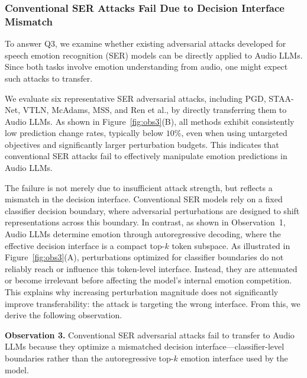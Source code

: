 
\subsubsection{Conventional SER Attacks Fail Due to Decision Interface Mismatch}
\label{sec:obs_q3}

To answer Q3, we examine whether existing adversarial attacks developed for speech emotion recognition (SER) models can be directly applied to Audio LLMs.
Since both tasks involve emotion understanding from audio, one might expect such attacks to transfer.

We evaluate six representative SER adversarial attacks, including PGD, STAA-Net, VTLN, McAdams, MSS, and Ren et al., by directly transferring them to Audio LLMs.
As shown in Figure~\ref{fig:obs3}(B), all methods exhibit consistently low prediction change rates, typically below $10\%$, even when using untargeted objectives and significantly larger perturbation budgets.
This indicates that conventional SER attacks fail to effectively manipulate emotion predictions in Audio LLMs.

The failure is not merely due to insufficient attack strength, but reflects a mismatch in the decision interface.
Conventional SER models rely on a fixed classifier decision boundary, where adversarial perturbations are designed to shift representations across this boundary.
In contrast, as shown in Observation~1, Audio LLMs determine emotion through autoregressive decoding, where the effective decision interface is a compact top-$k$ token subspace.
As illustrated in Figure~\ref{fig:obs3}(A), perturbations optimized for classifier boundaries do not reliably reach or influence this token-level interface.
Instead, they are attenuated or become irrelevant before affecting the model's internal emotion competition.
This explains why increasing perturbation magnitude does not significantly improve transferability: the attack is targeting the wrong interface.
From this, we derive the following observation.

\begin{obsbox}
\textbf{Observation 3.}
Conventional SER adversarial attacks fail to transfer to Audio LLMs because they optimize a mismatched decision interface—classifier-level boundaries rather than the autoregressive top-$k$ emotion interface used by the model.
\end{obsbox}



